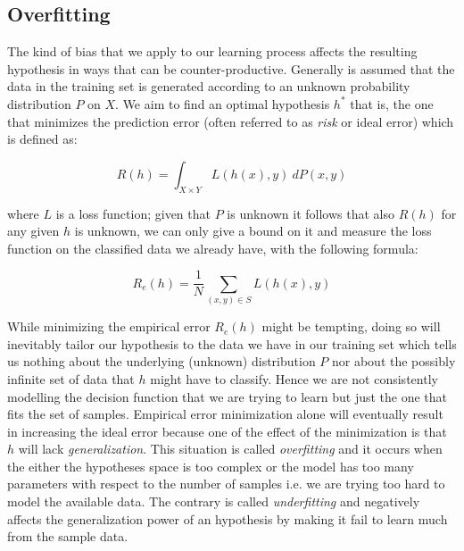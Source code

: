 \subsection{Overfitting}
The kind of bias that we apply to our learning process affects the resulting
hypothesis in ways that can be counter-productive.
Generally is assumed that the data in the training set is generated according
to an unknown probability distribution $P$ on $X$.
We aim to find an optimal hypothesis $h^*$ that is, the one that minimizes the
prediction error (often referred to as \emph{risk} or ideal error) which is
defined as:

\[R(h)=\int_{X\times Y} L(h(x),y)~dP(x,y)\]

where $L$ is a loss function; given that $P$ is unknown it follows that also
$R(h)$ for any given $h$ is unknown, we can only give a bound on it and measure
the loss function on the classified data we already have, with the following
formula:

\[R_e(h)=\frac{1}{N} \sum_{(x,y) \in S} L(h(x),y)\]

While minimizing the empirical error $R_e(h)$ might be tempting, doing so will
inevitably tailor our hypothesis to the data we have in our training set which
tells us nothing about the underlying (unknown) distribution $P$ nor about the 
possibly infinite set of data that $h$ might have to classify.
Hence we are not consistently modelling the decision function that we are trying
to learn but just the one that fits the set of samples.
Empirical error minimization alone will eventually result in increasing the ideal
error because one of the effect of the minimization is that $h$ will lack
\emph{generalization}.
This situation is called \emph{overfitting} and it occurs when the either the
hypotheses space is too complex or the model has too many parameters with
respect to the number of samples i.e. we are trying too hard to model the
available data.
The contrary is called \emph{underfitting} and negatively affects the
generalization power of an hypothesis by making it fail to learn much from the
sample data.

